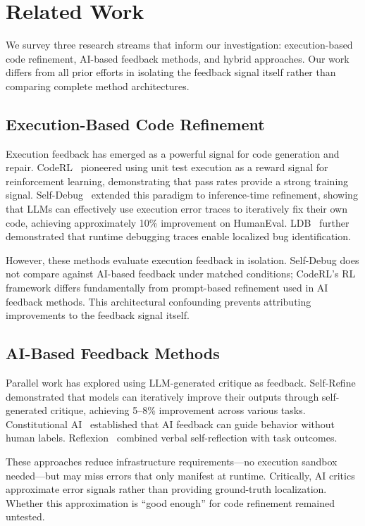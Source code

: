 \section{Related Work}
\label{sec:related}

We survey three research streams that inform our investigation: execution-based code refinement, AI-based feedback methods, and hybrid approaches. Our work differs from all prior efforts in isolating the feedback signal itself rather than comparing complete method architectures.

\subsection{Execution-Based Code Refinement}

Execution feedback has emerged as a powerful signal for code generation and repair. CodeRL~\cite{le2022coderl} pioneered using unit test execution as a reward signal for reinforcement learning, demonstrating that pass rates provide a strong training signal. Self-Debug~\cite{chen2023self} extended this paradigm to inference-time refinement, showing that LLMs can effectively use execution error traces to iteratively fix their own code, achieving approximately 10\% improvement on HumanEval. LDB~\cite{li2024ldb} further demonstrated that runtime debugging traces enable localized bug identification.

However, these methods evaluate execution feedback in isolation. Self-Debug does not compare against AI-based feedback under matched conditions; CodeRL's RL framework differs fundamentally from prompt-based refinement used in AI feedback methods. This architectural confounding prevents attributing improvements to the feedback signal itself.

\subsection{AI-Based Feedback Methods}

Parallel work has explored using LLM-generated critique as feedback. Self-Refine~\cite{madaan2023self} demonstrated that models can iteratively improve their outputs through self-generated critique, achieving 5--8\% improvement across various tasks. Constitutional AI~\cite{bai2022constitutional} established that AI feedback can guide behavior without human labels. Reflexion~\cite{shinn2023reflexion} combined verbal self-reflection with task outcomes.

These approaches reduce infrastructure requirements---no execution sandbox needed---but may miss errors that only manifest at runtime. Critically, AI critics approximate error signals rather than providing ground-truth localization. Whether this approximation is ``good enough'' for code refinement remained untested.

